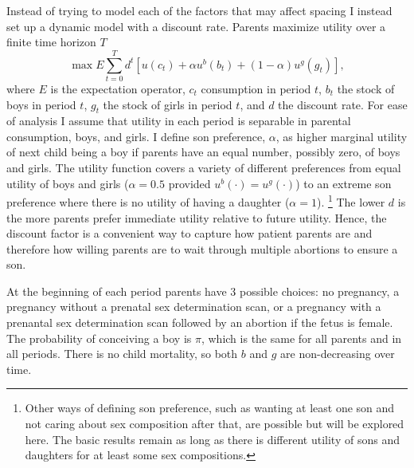 \documentclass[12pt,letterpaper]{article}
\begin{document}

Instead of trying to model each of the factors that may affect
spacing I instead set up a dynamic model with a discount rate.
Parents maximize utility over a finite time horizon $T$
\begin{equation}
\max E \sum_{t=0}^T d^t [ 
u(c_t) + \alpha u^b(b_t) + (1-\alpha) u^g(g_t) 
],
\label{eq:utility_1}
\end{equation}
where $E$ is the expectation operator,
$c_t$ consumption in period $t$, 
$b_t$ the stock of boys in period $t$,
$g_t$ the stock of girls in period $t$, and
$d$ the discount rate.
For ease of analysis I assume that utility in each period is separable in 
parental consumption, boys, and girls.
I define son preference, $\alpha$, as higher marginal utility of next child 
being a boy if parents have an equal number, possibly zero, of boys and girls.
The utility function covers a variety of different preferences 
from equal utility of boys and girls ($\alpha = 0.5$ provided
$u^b(\cdot) = u^g(\cdot)$) to an extreme 
son preference where there is no utility of having a daughter 
($\alpha = 1$).%
\footnote{
Other ways of defining son preference, such as wanting at least one son 
and not caring about sex composition after that, are possible but 
will be explored here.
The basic results remain as long as there is different
utility of sons and daughters for at least some sex compositions.
}
The lower $d$ is the more parents prefer immediate utility relative
to future utility.
Hence, the discount factor is a convenient way to capture how patient parents 
are and therefore how willing parents are to wait through multiple abortions 
to ensure a son. 

At the beginning of each period parents have 3 possible choices:
no pregnancy, a pregnancy without a prenatal sex determination scan,
or a pregnancy with a prenantal sex determination scan followed by an
abortion if the fetus is female.
The probability of conceiving a boy is $\pi$, which is
the same for all parents and in all periods.
There is no child mortality, so both
$b$ and $g$ are non-decreasing over time.
\end{document}
